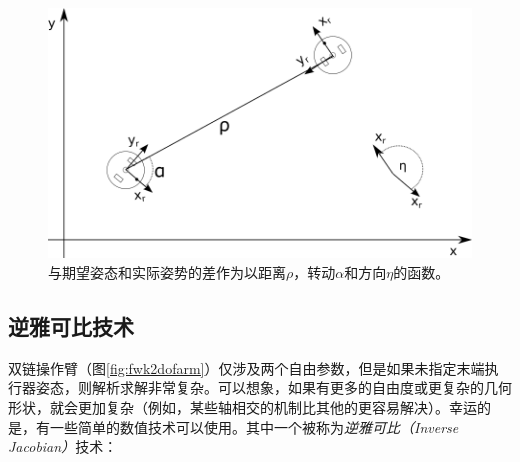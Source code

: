 \begin{figure}
	\centering
		\includegraphics[width=\textwidth]{figs/trajectorygen}
	\caption {与期望姿态和实际姿势的差作为以距离$\rho$，转动$\alpha$和方向$\eta$的函数。}
	\label{fig:trajectorygen}
\end{figure}



\subsection {逆雅可比技术}
\label{sec:invjac}
双链操作臂（图\ref{fig:fwk2dofarm}）仅涉及两个自由参数，但是如果未指定末端执行器姿态，则解析求解非常复杂。可以想象，如果有更多的自由度或更复杂的几何形状，就会更加复杂（例如，某些轴相交的机制比其他的更容易解决）。幸运的是，有一些简单的数值技术可以使用。其中一个被称为\emph{逆雅可比（Inverse Jacobian）}技术：


